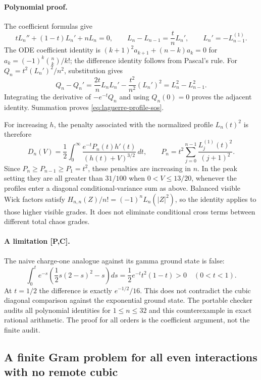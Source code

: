 \paragraph{Polynomial proof.}
The coefficient formulas give
\[
tL_n''+(1-t)L_n'+nL_n=0,\qquad
L_n-L_{n-1}=\frac tnL_n',\qquad L_n'=-L_{n-1}^{(1)}.
\]
The ODE coefficient identity is
$(k+1)^2a_{k+1}+(n-k)a_k=0$ for
$a_k=(-1)^k\binom nk/k!$; the difference identity follows from Pascal's rule.
For $Q_n=t^2(L_n')^2/n^2$, substitution gives
\[
Q_n-Q_n'=\frac{2t}{n}L_nL_n'-\frac{t^2}{n^2}(L_n')^2
=L_n^2-L_{n-1}^2.
\]
Integrating the derivative of $-e^{-t}Q_n$ and using $Q_n(0)=0$ proves
the adjacent identity. Summation proves \eqref{eq:laguerre-profile-sos}.

For increasing $h$, the penalty associated with the normalized profile
$L_n(t)^2$ is therefore
\[
D_n(V)=\frac12\int_0^\infty
\frac{e^{-t}P_n(t)h'(t)}{(h(t)+V)^{3/2}}\,dt,
\qquad
P_n=t^2\sum_{j=0}^{n-1}\frac{L_j^{(1)}(t)^2}{(j+1)^2}.
\]
Since $P_n\ge P_{n-1}\ge P_1=t^2$, these penalties are increasing in
$n$. In the peak setting they are all greater than $31/100$ when
$0<V\le13/20$, whenever the profiles enter a diagonal conditional-variance
sum as above. Balanced visible Wick factors satisfy
$H_{n,n}(Z)/n!=(-1)^nL_n(|Z|^2)$, so the identity applies to those higher
visible grades. It does not eliminate conditional cross terms between
different total chaos grades.

\paragraph{A limitation [P,C].}
The naive charge-one analogue against its gamma ground state is false:
\[
\int_0^t e^{-s}\left(\frac12s(2-s)^2-s\right)ds
=\frac12e^{-t}t^2(1-t)>0\quad(0<t<1).
\]
At $t=1/2$ the difference is exactly $e^{-1/2}/16$. This does not
contradict the cubic diagonal comparison against the exponential ground
state. The portable checker  audits
all polynomial identities for $1\le n\le32$ and this counterexample in
exact rational arithmetic. The proof for all orders is the coefficient
argument, not the finite audit.

\subsection{A finite Gram problem for all even interactions with no remote cubic}
\label{sec:even-gram-reduction}
